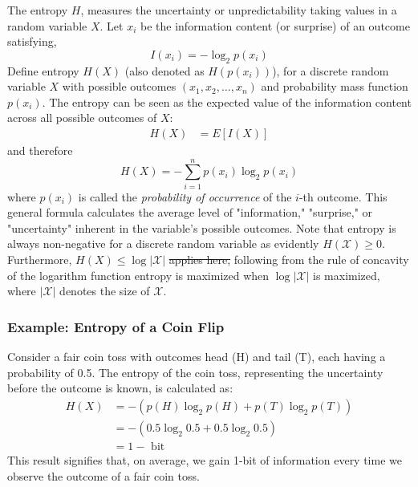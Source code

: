 \documentclass[journal,12pt,onecolumn,draftclsnofoot,]{IEEEtran}
\begin{document}
	The entropy \(H\), measures the uncertainty or unpredictability taking values in a random variable \(X\). Let \(x_i\) be the information content (or surprise) of an outcome satisfying,
	\begin{equation}
		I(x_i) = -\log_2 p(x_i)
	\end{equation}
	Define entropy  \(H(X)\) (also denoted as \(H(p(x_i))\)), for a discrete random variable \(X\) with possible outcomes \((x_1, x_2, \ldots, x_n)\) and probability mass function \(p(x_i)\). The entropy can be seen as the expected value of the information content across all possible outcomes of \(X\):
	\begin{align}
		H(X) &= E[I(X)] 
	\end{align}
	and therefore
	\begin{equation}
		H(X) = -\sum_{i=1}^{n} p(x_i) \log_2 p(x_i)
	\end{equation}
	where \(p(x_i)\) is called the \emph{probability of occurrence} of the \(i\)-th outcome. This general formula calculates the average level of "information," "surprise," or "uncertainty" inherent in the variable's possible outcomes. Note  that entropy is always non-negative for  a discrete random variable as evidently \(H(\mathcal{X}) \geq 0\). Furthermore, \(H(X) \leq \log | \mathcal{X} |\) \st{applies here,} following from the rule of concavity of the logarithm function entropy is maximized when \( \log | \mathcal{X} |\) is maximized, where \(|\mathcal{X} |\) denotes the size of \(\mathcal{X}\).
	
	\subsubsection{Example: Entropy of a Coin Flip}
	
	Consider a fair coin toss with outcomes head (H) and tail (T), each having a probability of 0.5. The entropy of the coin toss, representing the uncertainty before the outcome is known, is calculated as:
	\begin{align}
		H(X) &= -\left( p(H) \log_2 p(H) + p(T) \log_2 p(T) \right) \\
		&= -\left( 0.5 \log_2 0.5 + 0.5 \log_2 0.5 \right) \\
		&= 1 - \text{ bit}
	\end{align} 
	This result signifies that, on average, we gain 1-bit of information every time we observe the outcome of a fair coin toss.
	
\end{document}
